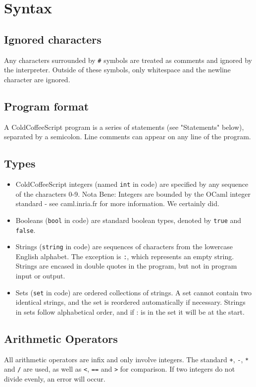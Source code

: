 \documentclass{article}
\begin{document}
\section{Syntax}
\subsection{Ignored characters}
Any characters surrounded by \lstinline|#| symbols are treated as comments and ignored by the interpreter. Outside of these symbols, only whitespace and the newline character are ignored.
\subsection{Program format}
A ColdCoffeeScript program is a series of statements (see "Statements" below), separated by a semicolon. Line comments can appear on any line of the program.
\subsection{Types}
\begin{itemize}
\item ColdCoffeeScript integers (named \lstinline|int| in code) are specified by any sequence of the characters 0-9. Nota Bene: Integers are bounded by the OCaml integer standard - see caml.inria.fr for more information. We certainly did.
\item Booleans (\lstinline|bool| in code) are standard boolean types, denoted by \lstinline|true| and \lstinline|false|.
\item Strings (\lstinline|string| in code) are sequences of characters from the lowercase English alphabet. The exception is \lstinline|:|, which represents an empty string. Strings are encased in double quotes in the program, but not in program input or output.
\item Sets (\lstinline|set| in code) are ordered collections of strings. A set cannot contain two identical strings, and the set is reordered automatically if necessary. Strings in sets follow alphabetical order, and if : is in the set it will be at the start.
\end{itemize}
\subsection{Arithmetic Operators}
All arithmetic operators are infix and only involve integers. The standard \lstinline|+|, \lstinline|-|, \lstinline|*| and \lstinline|/| are used, as well as \lstinline|<|, \lstinline|==| and \lstinline|>| for comparison. If two integers do not divide evenly, an error will occur.\\
\end{document}
